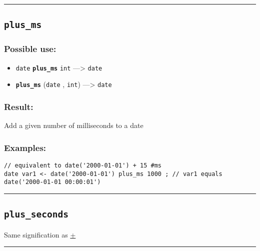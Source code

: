 \documentclass[]{book}
\providecommand{\tightlist}{%
  \setlength{\itemsep}{0pt}\setlength{\parskip}{0pt}}
\theoremstyle{definition}
\theoremstyle{definition}
\theoremstyle{definition}
\theoremstyle{remark}
\begin{document}
\begin{center}\rule{0.5\linewidth}{\linethickness}\end{center}

\subsection{\texorpdfstring{\texttt{plus\_ms}}{plus\_ms}}\label{plus_ms}

\subsubsection{Possible use:}\label{possible-use-405}

\begin{itemize}
\tightlist
\item
  \texttt{date} \textbf{\texttt{plus\_ms}} \texttt{int}
  ---\textgreater{} \texttt{date}
\item
  \textbf{\texttt{plus\_ms}} (\texttt{date} , \texttt{int})
  ---\textgreater{} \texttt{date}
\end{itemize}

\subsubsection{Result:}\label{result-391}

Add a given number of milliseconds to a date

\subsubsection{Examples:}\label{examples-280}

\begin{verbatim}
// equivalent to date('2000-01-01') + 15 #ms  
date var1 <- date('2000-01-01') plus_ms 1000 ; // var1 equals date('2000-01-01 00:00:01')
\end{verbatim}

\begin{center}\rule{0.5\linewidth}{\linethickness}\end{center}

\subsection{\texorpdfstring{\texttt{plus\_seconds}}{plus\_seconds}}\label{plus_seconds}

Same signification as \href{OperatorsAA\#+}{+}

\begin{center}\rule{0.5\linewidth}{\linethickness}\end{center}
\end{document}
